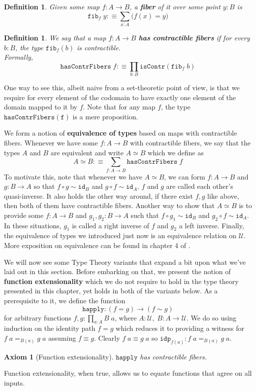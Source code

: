 \documentclass[12pt]{report}
\newtheorem{axiom}[thm]{Axiom}
\newtheorem{defn}[thm]{Definition}
\theoremstyle{definition}
\begin{document}
	\begin{defn}
	Given some map $f : A \rightarrow B$, a \textbf{fiber} of it over some point $y : B$ is
	$$\mathtt{fib}_f\; y :\equiv \sum_{x : A} \big(f(x) = y\big)$$
	\end{defn}

	\begin{defn}
	We say that a map $f : A\rightarrow B$ \textbf{has contractible fibers} if for every $b : B$, the type $\mathtt{fib}_f(b)$ is contractible.\\
	Formally, 
	$$ \mathtt{hasContrFibers}\; f : \equiv \prod_{b : B} \mathtt{isContr}(\mathtt{fib}_f\; b)$$
 	\end{defn}
 	One way to see this, albeit naive from a set-theoretic point of view, is that we require for every element of the codomain to have exactly one element of the domain mapped to it by $f$. 
 	Note that for any map $f$, the type $\mathtt{hasContrFibers(f)}$ is a mere proposition. 

 	We form a notion of \textbf{equivalence of types} based on maps with contractible fibers. 
 	Whenever we have some $f : A\rightarrow B$ with contractible fibers, we say that the types $A$ and $B$ are equivalent and write $A \simeq B$ which we define as 
 	$$A\simeq B :\equiv \sum_{f : A \rightarrow B}\mathtt{hasContrFibers}\;f$$ 
 	To motivate this, note that whenever we have $A\simeq B$, we can form $f : A\rightarrow B$ and $g : B \rightarrow A$ so that $f\circ g \sim \mathtt{id}_B$ and $g\circ f \sim \mathtt{id}_A$. 
 	$f$ and $g$ are called each other's quasi-inverse.
 	It also holds the other way around, if there exist $f,g$ like above, then both of them have contractible fibers. 
 	Another way to show that $A\simeq B$ is to provide some $f : A\rightarrow B$ and $g_1,g_2 : B \rightarrow A$ such that $f \circ g_1 \sim \mathtt{id}_B$ and $g_2 \circ f \sim \mathtt{id}_A$. 
 	In these situations, $g_1$ is called a right inverse of $f$ and $g_2$ a left inverse. 
 	Finally, the equivalence of types we introduced just now is an equivalence relation on $\mathcal{U}$. 
 	More exposition on equivalence can be found in chapter 4 of \cite{hottbook}.

 	We will now see some Type Theory variants that expand a bit upon what we've laid out in this section. 
 	Before embarking on that, we present the notion of \textbf{function extensionality} which we do not require to hold in the type theory presented in this chapter, yet holds in both of the variants below. 
 	As a prerequisite to it, we define the function 
 	$$\mathtt{happly} : (f = g) \rightarrow (f \sim g)$$
 	for arbitrary functions $f,g : \prod_{a :A}B\;a$, where $A : \mathcal{U},\; B : A \rightarrow \mathcal{U}$. We do so using induction on the identity path $f = g$ which reduces it to providing a witness for $f\;a =_{B(a)} g\;a$ assuming $f \equiv g$. 
 	Clearly $f\;a \equiv g\;a$ so $\mathtt{idp}_{f(a)} : f\;a =_{B(a)} g\;a$. 
 	\begin{axiom}[Function extensionality] 
 	$\mathtt{happly}$ has contractible fibers. 
 	\end{axiom}
 	Function extensionality, when true, allows us to equate functions that agree on all inputs. 
\end{document}
